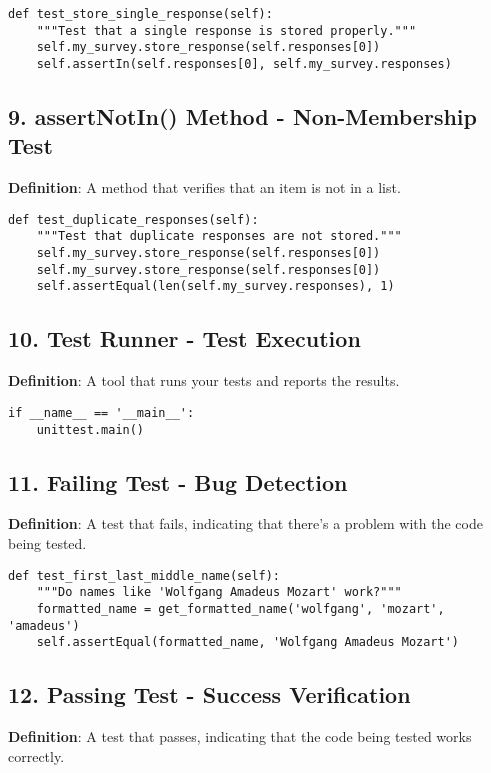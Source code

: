 \begin{lstlisting}
def test_store_single_response(self):
    """Test that a single response is stored properly."""
    self.my_survey.store_response(self.responses[0])
    self.assertIn(self.responses[0], self.my_survey.responses)
\end{lstlisting}

\subsection*{9. assertNotIn() Method - Non-Membership Test}
\textbf{Definition}: A method that verifies that an item is not in a list.

\begin{lstlisting}
def test_duplicate_responses(self):
    """Test that duplicate responses are not stored."""
    self.my_survey.store_response(self.responses[0])
    self.my_survey.store_response(self.responses[0])
    self.assertEqual(len(self.my_survey.responses), 1)
\end{lstlisting}

\subsection*{10. Test Runner - Test Execution}
\textbf{Definition}: A tool that runs your tests and reports the results.

\begin{lstlisting}
if __name__ == '__main__':
    unittest.main()
\end{lstlisting}

\subsection*{11. Failing Test - Bug Detection}
\textbf{Definition}: A test that fails, indicating that there's a problem with the code being tested.

\begin{lstlisting}
def test_first_last_middle_name(self):
    """Do names like 'Wolfgang Amadeus Mozart' work?"""
    formatted_name = get_formatted_name('wolfgang', 'mozart', 'amadeus')
    self.assertEqual(formatted_name, 'Wolfgang Amadeus Mozart')
\end{lstlisting}

\subsection*{12. Passing Test - Success Verification}
\textbf{Definition}: A test that passes, indicating that the code being tested works correctly.

